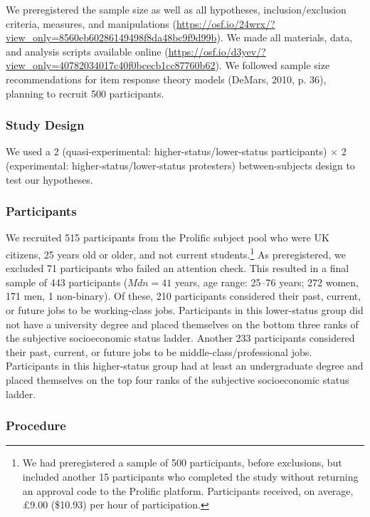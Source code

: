 \documentclass[12pt, letterpaper]{article}
\begin{document}
We preregistered the sample size as well as all hypotheses,
inclusion/exclusion criteria, measures, and manipulations
(\url{https://osf.io/24wrx/?view_only=8560eb60286149498f8da48bc9f9d99b}).
We made all materials, data, and analysis scripts available online
(\url{https://osf.io/d3yev/?view_only=40782034017c40f0bcecb1cc87760b62}).
We followed sample size recommendations for item response theory models
(DeMars, 2010, p. 36), planning to recruit 500 participants.

\hypertarget{study-design}{%
\subsubsection{Study Design}\label{study-design}}

We used a 2 (quasi-experimental: higher-status/lower-status
participants) \(\times\) 2 (experimental: higher-status/lower-status
protesters) between-subjects design to test our hypotheses.

\hypertarget{participants}{%
\subsubsection{Participants}\label{participants}}

We recruited 515 participants from the Prolific subject pool who were UK
citizens, 25 years old or older, and not current students.\footnote{We
  had preregistered a sample of 500 participants, before exclusions, but
  included another 15 participants who completed the study without
  returning an approval code to the Prolific platform. Participants
  received, on average, \pounds 9.00 (\$10.93) per hour of
  participation.} As preregistered, we excluded 71 participants who
failed an attention check. This resulted in a final sample of 443
participants (\(\textit{Mdn} = 41\) years, age range: 25--76 years; 272
women, 171 men, 1 non-binary). Of these, 210 participants considered
their past, current, or future jobs to be working-class jobs.
Participants in this lower-status group did not have a university degree
and placed themselves on the bottom three ranks of the subjective
socioeconomic status ladder. Another 233 participants considered their
past, current, or future jobs to be middle-class/professional jobs.
Participants in this higher-status group had at least an undergraduate
degree and placed themselves on the top four ranks of the subjective
socioeconomic status ladder.

\hypertarget{procedure}{%
\subsubsection{Procedure}\label{procedure}}
\end{document}
